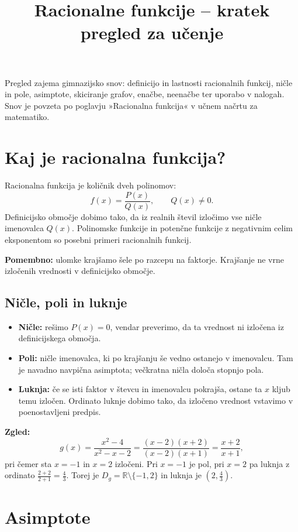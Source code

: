 \documentclass[11pt]{article}
\title{Racionalne funkcije -- kratek pregled za učenje}
\date{}
\author{}
\begin{document}
\maketitle

Pregled zajema gimnazijsko snov: definicijo in lastnosti racionalnih funkcij, ničle in pole, asimptote, skiciranje grafov, enačbe, neenačbe ter uporabo v nalogah. Snov je povzeta po poglavju »Racionalna funkcija« v učnem načrtu za matematiko.

\section{Kaj je racionalna funkcija?}

Racionalna funkcija je količnik dveh polinomov:
\[
 f(x)=\frac{P(x)}{Q(x)},\qquad Q(x)\ne 0.
\]
Definicijsko območje dobimo tako, da iz realnih števil izločimo vse ničle imenovalca $Q(x)$. Polinomske funkcije in potenčne funkcije z negativnim celim eksponentom so posebni primeri racionalnih funkcij.

\textbf{Pomembno:} ulomke krajšamo šele po razcepu na faktorje. Krajšanje ne vrne izločenih vrednosti v definicijsko območje.

\subsection{Ničle, poli in luknje}

\begin{itemize}[leftmargin=*]
  \item \textbf{Ničle:} rešimo $P(x)=0$, vendar preverimo, da ta vrednost ni izločena iz definicijskega območja.
  \item \textbf{Poli:} ničle imenovalca, ki po krajšanju še vedno ostanejo v imenovalcu. Tam je navadno navpična asimptota; večkratna ničla določa stopnjo pola.
  \item \textbf{Luknja:} če se isti faktor v števcu in imenovalcu pokrajša, ostane ta $x$ kljub temu izločen. Ordinato luknje dobimo tako, da izločeno vrednost vstavimo v poenostavljeni predpis.
\end{itemize}

\textbf{Zgled:}
\[
 g(x)=\frac{x^2-4}{x^2-x-2}=\frac{(x-2)(x+2)}{(x-2)(x+1)}=\frac{x+2}{x+1},
\]
pri čemer sta $x=-1$ in $x=2$ izločeni. Pri $x=-1$ je pol, pri $x=2$ pa luknja z ordinato $\frac{2+2}{2+1}=\frac{4}{3}$. Torej je $D_g=\mathbb{R}\setminus\{-1,2\}$ in luknja je $\left(2,\frac{4}{3}\right)$.

\section{Asimptote}
\end{document}

